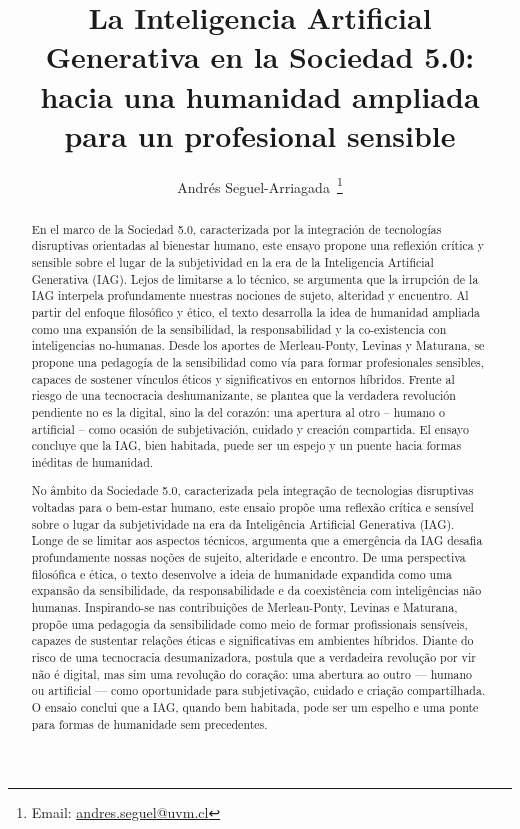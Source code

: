 \documentclass[spanish]{textolivre}
\title{La Inteligencia Artificial Generativa en la Sociedad 5.0: hacia una humanidad ampliada para un profesional sensible}
\author[1]{Andrés Seguel-Arriagada~\orcid{0000-0003-2549-5890 }\thanks{Email: \href{mailto:andres.seguel@uvm.cl}{andres.seguel@uvm.cl}}}
\affil[1]{Universidad Viña del Mar, Viña del Mar, Valparaíso, Chile.}
\begin{document}
\maketitle

\begin{polyabstract}
\begin{abstract}
En el marco de la Sociedad 5.0, caracterizada por la integración de tecnologías disruptivas orientadas al bienestar humano, este ensayo propone una reflexión crítica y sensible sobre el lugar de la subjetividad en la era de la Inteligencia Artificial Generativa (IAG). Lejos de limitarse a lo técnico, se argumenta que la irrupción de la IAG interpela profundamente nuestras nociones de sujeto, alteridad y encuentro. Al partir del enfoque filosófico y ético, el texto desarrolla la idea de humanidad ampliada como una expansión de la sensibilidad, la responsabilidad y la co-existencia con inteligencias no-humanas. Desde los aportes de Merleau-Ponty, Levinas y Maturana, se propone una pedagogía de la sensibilidad como vía para formar profesionales sensibles, capaces de sostener vínculos éticos y significativos en entornos híbridos. Frente al riesgo de una tecnocracia deshumanizante, se plantea que la verdadera revolución pendiente no es la digital, sino la del corazón: una apertura al otro – humano o artificial – como ocasión de subjetivación, cuidado y creación compartida. El ensayo concluye que la IAG, bien habitada, puede ser un espejo y un puente hacia formas inéditas de humanidad.

\end{abstract}

\begin{portuguese}
\begin{abstract}
No âmbito da Sociedade 5.0, caracterizada pela integração de tecnologias disruptivas voltadas para o bem-estar humano, este ensaio propõe uma reflexão crítica e sensível sobre o lugar da subjetividade na era da Inteligência Artificial Generativa (IAG). Longe de se limitar aos aspectos técnicos, argumenta que a emergência da IAG desafia profundamente nossas noções de sujeito, alteridade e encontro. De uma perspectiva filosófica e ética, o texto desenvolve a ideia de humanidade expandida como uma expansão da sensibilidade, da responsabilidade e da coexistência com inteligências não humanas. Inspirando-se nas contribuições de Merleau-Ponty, Levinas e Maturana, propõe uma pedagogia da sensibilidade como meio de formar profissionais sensíveis, capazes de sustentar relações éticas e significativas em ambientes híbridos. Diante do risco de uma tecnocracia desumanizadora, postula que a verdadeira revolução por vir não é digital, mas sim uma revolução do coração: uma abertura ao outro — humano ou artificial — como oportunidade para subjetivação, cuidado e criação compartilhada. O ensaio conclui que a IAG, quando bem habitada, pode ser um espelho e uma ponte para formas de humanidade sem precedentes.


\end{abstract}
\end{portuguese}
\end{polyabstract}
\end{document}
